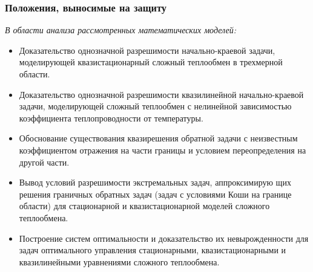 \begin{frame}
    \frametitle{Положения, выносимые на защиту}
    \textit{В области анализа рассмотренных математических моделей:}
    \begin{itemize}
        \item Доказательство однозначной разрешимости начально-краевой задачи,
        моделирующей квазистационарный сложный теплообмен в трехмерной
        области.
        \item Доказательство однозначной разрешимости квазилинейной начально-краевой задачи,
        моделирующей сложный теплообмен с нелинейной
        зависимостью коэффициента теплопроводности от температуры.
        \item Обоснование существования квазирешения обратной задачи с неизвестным
        коэффициентом отражения на части границы и условием
        переопределения на другой части.
        \item Вывод условий разрешимости экстремальных задач, аппроксимирую
        щих решения граничных обратных задач (задач с условиями Коши на границе области)
        для стационарной и квазистационарной моделей сложного теплообмена.
        \item Построение систем оптимальности и доказательство их невырожденности
        для задач оптимального управления стационарными, квазистационарными
        и квазилинейными уравнениями сложного теплообмена.
    \end{itemize}
\end{frame}


